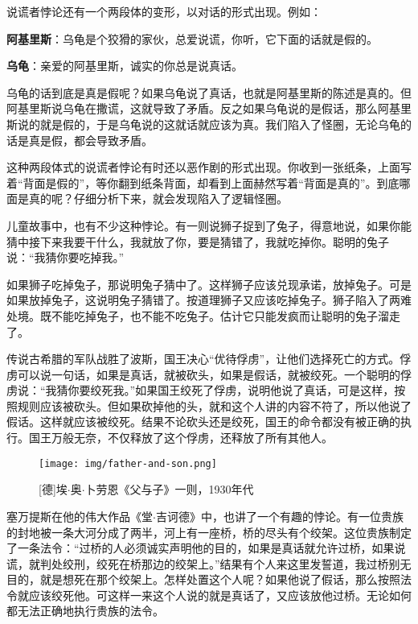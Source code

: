\documentclass[b5paper]{ctexart}
\begin{document}
说谎者悖论还有一个两段体的变形，以对话的形式出现。例如：

\textbf{阿基里斯}：乌龟是个狡猾的家伙，总爱说谎，你听，它下面的话就是假的。

\textbf{乌龟}：亲爱的阿基里斯，诚实的你总是说真话。

乌龟的话到底是真是假呢？如果乌龟说了真话，也就是阿基里斯的陈述是真的。但阿基里斯说乌龟在撒谎，这就导致了矛盾。反之如果乌龟说的是假话，那么阿基里斯说的就是假的，于是乌龟说的这就话就应该为真。我们陷入了怪圈，无论乌龟的话是真是假，都会导致矛盾。

这种两段体式的说谎者悖论有时还以恶作剧的形式出现。你收到一张纸条，上面写着“背面是假的”，等你翻到纸条背面，却看到上面赫然写着“背面是真的”。到底哪面是真的呢？仔细分析下来，就会发现陷入了逻辑怪圈。

儿童故事中，也有不少这种悖论。有一则说狮子捉到了兔子，得意地说，如果你能猜中接下来我要干什么，我就放了你，要是猜错了，我就吃掉你。聪明的兔子说：“我猜你要吃掉我。”

如果狮子吃掉兔子，那说明兔子猜中了。这样狮子应该兑现承诺，放掉兔子。可是如果放掉兔子，这说明兔子猜错了。按道理狮子又应该吃掉兔子。狮子陷入了两难处境。既不能吃掉兔子，也不能不吃兔子。估计它只能发疯而让聪明的兔子溜走了。

传说古希腊的军队战胜了波斯，国王决心“优待俘虏”，让他们选择死亡的方式。俘虏可以说一句话，如果是真话，就被砍头，如果是假话，就被绞死。一个聪明的俘虏说：“我猜你要绞死我。”如果国王绞死了俘虏，说明他说了真话，可是这样，按照规则应该被砍头。但如果砍掉他的头，就和这个人讲的内容不符了，所以他说了假话。这样就应该被绞死。结果不论砍头还是绞死，国王的命令都没有被正确的执行。国王万般无奈，不仅释放了这个俘虏，还释放了所有其他人。

\begin{wrapfigure}{L}{0.5\textwidth}
 \centering
 \texttt{[image: img/father-and-son.png]}
 \caption{[德]埃$\cdot$奥$\cdot$卜劳恩《父与子》一则，1930年代}
 \label{fig:father-and-son}
\end{wrapfigure}

塞万提斯在他的伟大作品《堂$\cdot$吉诃德》中，也讲了一个有趣的悖论。有一位贵族的封地被一条大河分成了两半，河上有一座桥，桥的尽头有个绞架。这位贵族制定了一条法令：“过桥的人必须诚实声明他的目的，如果是真话就允许过桥，如果说谎，就判处绞刑，绞死在桥那边的绞架上。”结果有个人来这里发誓道，我过桥别无目的，就是想死在那个绞架上。怎样处置这个人呢？如果他说了假话，那么按照法令就应该绞死他。可这样一来这个人说的就是真话了，又应该放他过桥。无论如何都无法正确地执行贵族的法令。
\end{document}
